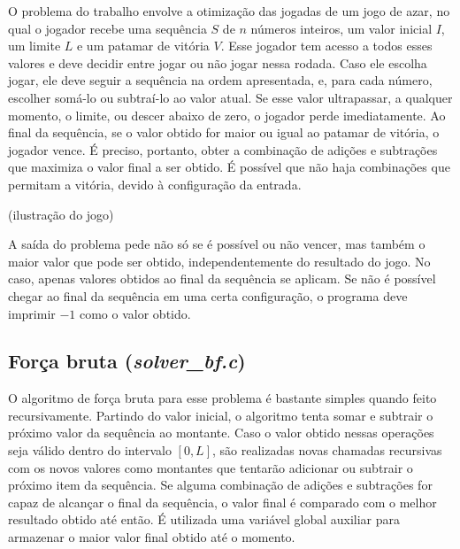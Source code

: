 \documentclass[10pt,a4paper]{article}
\numberwithin{equation}{section}
\begin{document}
O problema do trabalho envolve a otimização das jogadas de um jogo de azar, no qual o jogador recebe uma sequência $S$ de $n$ números inteiros, um valor inicial $I$, um limite $L$ e um patamar de vitória $V$. Esse jogador tem acesso a todos esses valores e deve decidir entre jogar ou não jogar nessa rodada. Caso ele escolha jogar, ele deve seguir a sequência na ordem apresentada, e, para cada número, escolher somá-lo ou subtraí-lo ao valor atual. Se esse valor ultrapassar, a qualquer momento, o limite, ou descer abaixo de zero, o jogador perde imediatamente. Ao final da sequência, se o valor obtido for maior ou igual ao patamar de vitória, o jogador vence. É preciso, portanto, obter a combinação de adições e subtrações que maximiza o valor final a ser obtido. É possível que não haja combinações que permitam a vitória, devido à configuração da entrada.

(ilustração do jogo)

A saída do problema pede não só se é possível ou não vencer, mas também o maior valor que pode ser obtido, independentemente do resultado do jogo. No caso, apenas valores obtidos ao final da sequência se aplicam. Se não é possível chegar ao final da sequência em uma certa configuração, o programa deve imprimir $-1$ como o valor obtido.

\subsection{Força bruta (\emph{solver\_bf.c})}

O algoritmo de força bruta para esse problema é bastante simples quando feito recursivamente. Partindo do valor inicial, o algoritmo tenta somar e subtrair o próximo valor da sequência ao montante. Caso o valor obtido nessas operações seja válido dentro do intervalo $[0,L]$, são realizadas novas chamadas recursivas com os novos valores como montantes que tentarão adicionar ou subtrair o próximo item da sequência. Se alguma combinação de adições e subtrações for capaz de alcançar o final da sequência, o valor final é comparado com o melhor resultado obtido até então. É utilizada uma variável global auxiliar para armazenar o maior valor final obtido até o momento.
\end{document}
